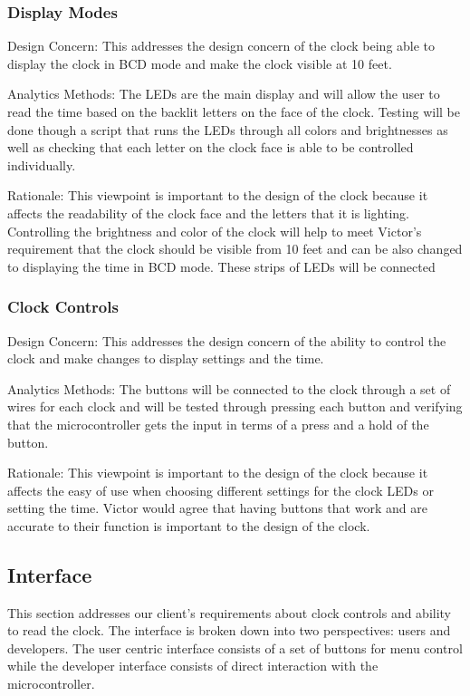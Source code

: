 \documentclass[10pt,draftclsnofoot,onecolumn]{IEEEtran}
\begin{document}
\subsubsection{Display Modes}
Design Concern: This addresses the design concern of the clock being able to display the clock in BCD mode and make the clock visible at 10 feet. 

Analytics Methods: The LEDs are the main display and will allow the user to read the time based on the backlit letters on the face of the clock. Testing will be done though a script that runs the LEDs through all colors and brightnesses as well as checking that each letter on the clock face is able to be controlled individually. 

Rationale: This viewpoint is important to the design of the clock because it affects the readability of the clock face and the letters that it is lighting. Controlling the brightness and color of the clock will help to meet Victor's requirement that the clock should be visible from 10 feet and can be also changed to displaying the time in BCD mode. These strips of LEDs will be connected  

\subsubsection{Clock Controls}
Design Concern: This addresses the design concern of the ability to control the clock and make changes to display settings and the time.

Analytics Methods: The buttons will be connected to the clock through a set of wires for each clock and will be tested through pressing each button and verifying that the microcontroller gets the input in terms of a press and a hold of the button. 

Rationale: This viewpoint is important to the design of the clock because it affects the easy of use when choosing different settings for the clock LEDs or setting the time. Victor would agree that having buttons that work and are accurate to their function is important to the design of the clock.  

\subsection{Interface}
This section addresses our client's requirements about clock controls and ability to read the clock.
The interface is broken down into two perspectives: users and developers.
The user centric interface consists of a set of buttons for menu control while the developer interface consists of direct interaction with the microcontroller.
\end{document}
